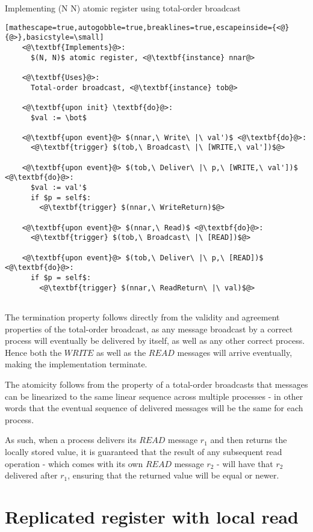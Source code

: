 \documentclass[a4paper]{scrreprt}
\begin{document}
\begin{library}{Implementing (N N) atomic register using total-order broadcast}
  \begin{lstlisting}[mathescape=true,autogobble=true,breaklines=true,escapeinside={<@}{@>},basicstyle=\small]
    <@\textbf{Implements}@>:
      $(N, N)$ atomic register, <@\textbf{instance} nnar@>

    <@\textbf{Uses}@>:
      Total-order broadcast, <@\textbf{instance} tob@>

    <@\textbf{upon init} \textbf{do}@>:
      $val := \bot$

    <@\textbf{upon event}@> $(nnar,\ Write\ |\ val')$ <@\textbf{do}@>:
      <@\textbf{trigger} $(tob,\ Broadcast\ |\ [WRITE,\ val'])$@>

    <@\textbf{upon event}@> $(tob,\ Deliver\ |\ p,\ [WRITE,\ val'])$ <@\textbf{do}@>:
      $val := val'$
      if $p = self$:
        <@\textbf{trigger} $(nnar,\ WriteReturn)$@>

    <@\textbf{upon event}@> $(nnar,\ Read)$ <@\textbf{do}@>:
      <@\textbf{trigger} $(tob,\ Broadcast\ |\ [READ])$@>

    <@\textbf{upon event}@> $(tob,\ Deliver\ |\ p,\ [READ])$ <@\textbf{do}@>:
      if $p = self$:
        <@\textbf{trigger} $(nnar,\ ReadReturn\ |\ val)$@>
      
  \end{lstlisting}
\end{library}

The termination property follows directly from the validity and agreement
properties of the total-order broadcast, as any message broadcast by a correct
process will eventually be delivered by itself, as well as any other correct
process. Hence both the $WRITE$ as well as the $READ$ messages will arrive
eventually, making the implementation terminate.

The atomicity follows from the property of a total-order broadcasts that
messages can be linearized to the same linear sequence across multiple
processes - in other words that the eventual sequence of delivered messages
will be the same for each process.

As such, when a process delivers its $READ$ message $r_1$ and then returns the
locally stored value, it is guaranteed that the result of any subsequent read
operation - which comes with its own $READ$ message $r_2$ - will have that
$r_2$ delivered after $r_1$, ensuring that the returned value will be equal or
newer.

\section{Replicated register with local read}
\end{document}
